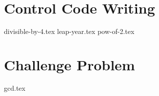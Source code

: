 \documentclass{exam}
\begin{document}
\section{Control Code Writing}
\begin{questions}
{divisible-by-4.tex}
{leap-year.tex}
{pow-of-2.tex}
\end{questions}

\newpage
\section{Challenge Problem}
\begin{questions}
{gcd.tex}
\end{questions}
\end{document}
